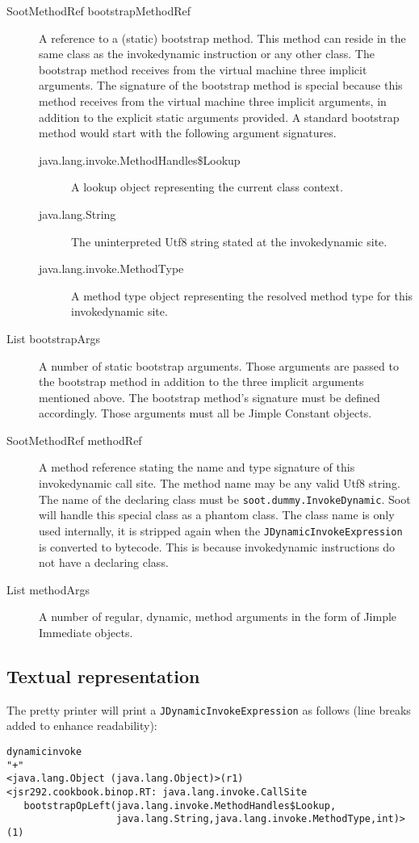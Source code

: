 \documentclass{article}
\newcommand{\id}{invokedynamic\xspace}
\begin{document}
\begin{description}
  \item[SootMethodRef bootstrapMethodRef] A reference to a (static)
  bootstrap method. This method can reside in the same class as the \id instruction or any
  other class. The bootstrap method receives from the virtual machine three
  implicit arguments. The signature of the bootstrap method is special because
  this method receives from the virtual machine three implicit arguments,
  in addition to the explicit static arguments provided. A standard bootstrap
  method would start with the following argument signatures.
  \begin{description}
  \item[java.lang.invoke.MethodHandles\$Lookup] A lookup object representing the
  current class context.
  \item[java.lang.String] The uninterpreted Utf8 string stated at the \id site.
  \item[java.lang.invoke.MethodType] A method type object representing the
  resolved method type for this \id site.
  \end{description}
  \item[List bootstrapArgs] A number of static bootstrap arguments. Those
  arguments are passed to the bootstrap method in addition to the three implicit
  arguments mentioned above. The bootstrap method's signature must be defined
  accordingly. Those arguments must all be Jimple Constant objects.
  \item[SootMethodRef methodRef] A method reference stating the name and type
  signature of this \id call site. The method name may be any valid Utf8 string.
  The name of the declaring class must be \texttt{soot.dummy.InvokeDynamic}.
  Soot will handle this special class as a phantom class. The class name is only
  used internally, it is stripped again when the
  \texttt{JDynamicInvokeExpression} is converted to bytecode. This is because
  invokedynamic instructions do not have a declaring class. 
  \item[List methodArgs] A number of regular, dynamic, method arguments in the
  form of Jimple Immediate objects.
\end{description}

\subsection*{Textual representation}
The pretty printer will print a \texttt{JDynamicInvokeExpression} as follows
(line breaks added to enhance readability):
\begin{verbatim}
dynamicinvoke
"+"
<java.lang.Object (java.lang.Object)>(r1)
<jsr292.cookbook.binop.RT: java.lang.invoke.CallSite
   bootstrapOpLeft(java.lang.invoke.MethodHandles$Lookup,
                   java.lang.String,java.lang.invoke.MethodType,int)>(1)
\end{verbatim}
\end{document}
